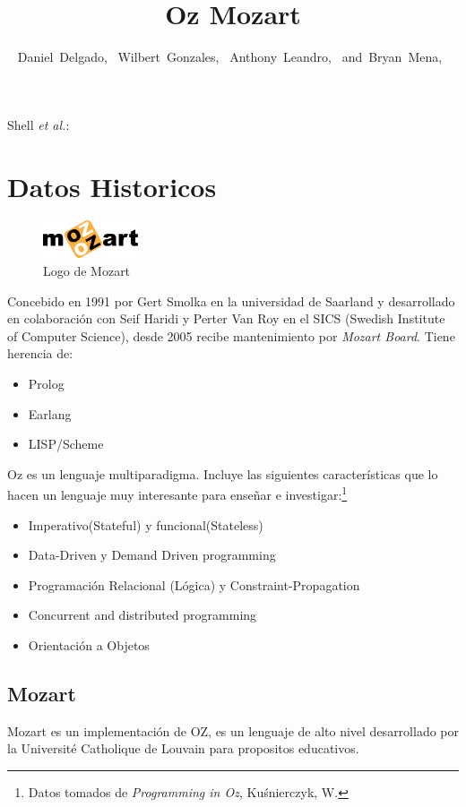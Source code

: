 \documentclass[10pt,journal,compsoc]{IEEEtran}
\begin{document}
\title{Oz Mozart}
\author{Daniel~Delgado,~
        Wilbert~Gonzales,~
        Anthony~Leandro,~
        and~Bryan~Mena,~
}
{Shell \MakeLowercase{\textit{et al.}}: \LaTex}
\maketitle
\IEEEdisplaynontitleabstractindextext
\IEEEpeerreviewmaketitle

\section{Datos Historicos}
\begin{figure}
	\centering
	\includegraphics[width=0.25\textwidth]{logo.png}
	\caption{\label{fig:Logo}Logo de Mozart}
\end{figure}
Concebido en 1991 por Gert Smolka en la universidad de Saarland y desarrollado en colaboraci\'on con Seif Haridi y Perter Van Roy en el SICS (Swedish Institute of Computer Science), desde 2005 recibe mantenimiento por \emph{Mozart Board}. Tiene herencia de:
\begin{itemize}
	\item Prolog
	\item Earlang
	\item LISP/Scheme
\end{itemize}
Oz es un lenguaje multiparadigma. Incluye las siguientes caracter\'isticas que lo hacen un lenguaje muy interesante para ense\~nar e investigar:\footnote{Datos tomados de \emph{Programming in Oz}, Ku\'snierczyk, W.}
\begin{itemize}
	\item Imperativo(Stateful) y funcional(Stateless)
	\item Data-Driven y Demand Driven programming
	\item Programaci\'on Relacional (L\'ogica) y Constraint-Propagation
	\item Concurrent and distributed programming
	\item Orientaci\'on a Objetos
\end{itemize}
\subsection{Mozart}
Mozart es un implementaci\'on de OZ, es un lenguaje de alto nivel desarrollado por la Universit\'e Catholique de Louvain para propositos educativos.
\end{document}
